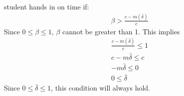 \documentclass[11pt,preprint, authoryear]{elsarticle}
\numberwithin{equation}{section}
\numberwithin{figure}{section}
\numberwithin{table}{section}
\begin{document}
student hands in on time if: \begin{align*}{}
\beta>\frac{c-m(\bar{\delta})}{c}
\end{align*}{} Since \(0 \leq \beta \leq 1\), \(\beta\) cannot be
greater than 1. This implies \begin{align*}{}
\frac{c-m(\bar{\delta})}{c} \leq 1 \\
c-m \bar{\delta} \leq c \\
-m \bar{\delta} \leq 0 \\
0 \leq \bar{\delta}
\end{align*}{} Since \(0 \leq \bar{\delta} \leq 1\), this condition will
always hold.


\end{document}
